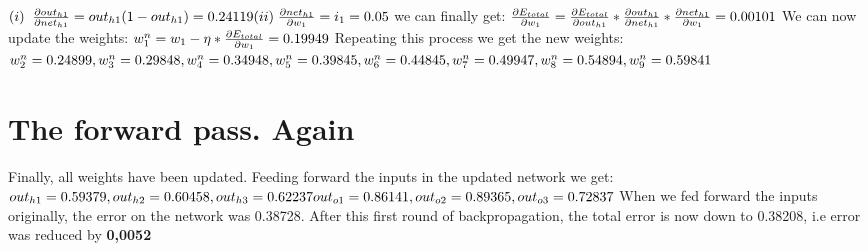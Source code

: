 \documentclass[12pt]{article}
\begin{document}
\begin{math}
\newline\newline
(i)\;\; \frac{\partial out_{h1}}{\partial net_{h1}} = out_{h1}(1 - out_{h1}) = 0.24119
\newline\newline
(ii)\; \frac{\partial net_{h1}}{\partial w_1} = i_1 = 0.05
\newline\newline
\end{math}
we can finally get:
\begin{math}
\newline\newline
\frac{\partial E_{total}}{\partial w_{1}} = \frac{\partial E_{total}}{\partial out_{h1}} * \frac{\partial out_{h1}}{\partial net_{h1}} * \frac{\partial net_{h1}}{\partial w_{1}} = 0.00101
\newline\newline
\end{math}
We can now update the weights:
\begin{math}
\newline\newline
w_1^{n} = w_1 - \eta * \frac{\partial E_{total}}{\partial w_{1}} = 0.19949
\newline\newline
\end{math}
Repeating this process we get the new weights:
\begin{math}
\newline
w_{2}^{n} = 0.24899, w_{3}^{n} = 0.29848, w_{4}^{n} = 0.34948, w_{5}^{n} = 0.39845, w_{6}^{n} = 0.44845,\newline
w_{7}^{n} = 0.49947, w_{8}^{n} = 0.54894, w_{9}^{n} = 0.59841
\end{math}
\section{The forward pass. Again}
Finally, all weights have been updated.
Feeding forward the inputs in the updated network we get:
\begin{math}
\newline\newline
out_{h1} = 0.59379, out_{h2} = 0.60458, out_{h3} = 0.62237\newline
out_{o1} = 0.86141, out_{o2} = 0.89365, out_{o3} = 0.72837
\newline\newline
\end{math}
When we fed forward the inputs originally, the error on the network was 0.38728. After this first round of backpropagation, the total error is now down to 0.38208, i.e error was reduced by \textbf{0,0052}
\end{document}
